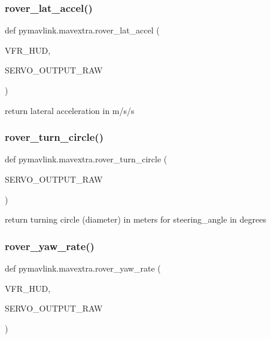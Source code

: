 \subsubsection{\texorpdfstring{rover\+\_\+lat\+\_\+accel()}{rover\_lat\_accel()}}
{\footnotesize\ttfamily def pymavlink.\+mavextra.\+rover\+\_\+lat\+\_\+accel (\begin{DoxyParamCaption}\item[{}]{V\+F\+R\+\_\+\+H\+UD,  }\item[{}]{S\+E\+R\+V\+O\+\_\+\+O\+U\+T\+P\+U\+T\+\_\+\+R\+AW }\end{DoxyParamCaption})}

\begin{DoxyVerb}return lateral acceleration in m/s/s\end{DoxyVerb}
 \mbox{\label{namespacepymavlink_1_1mavextra_a2cf4432c48b582f8471874e3ae33de17}} 
\subsubsection{\texorpdfstring{rover\+\_\+turn\+\_\+circle()}{rover\_turn\_circle()}}
{\footnotesize\ttfamily def pymavlink.\+mavextra.\+rover\+\_\+turn\+\_\+circle (\begin{DoxyParamCaption}\item[{}]{S\+E\+R\+V\+O\+\_\+\+O\+U\+T\+P\+U\+T\+\_\+\+R\+AW }\end{DoxyParamCaption})}

\begin{DoxyVerb}return turning circle (diameter) in meters for steering_angle in degrees
\end{DoxyVerb}
 \mbox{\label{namespacepymavlink_1_1mavextra_a06610d38e6694c31c2fdbaafd57eae54}} 
\subsubsection{\texorpdfstring{rover\+\_\+yaw\+\_\+rate()}{rover\_yaw\_rate()}}
{\footnotesize\ttfamily def pymavlink.\+mavextra.\+rover\+\_\+yaw\+\_\+rate (\begin{DoxyParamCaption}\item[{}]{V\+F\+R\+\_\+\+H\+UD,  }\item[{}]{S\+E\+R\+V\+O\+\_\+\+O\+U\+T\+P\+U\+T\+\_\+\+R\+AW }\end{DoxyParamCaption})}


